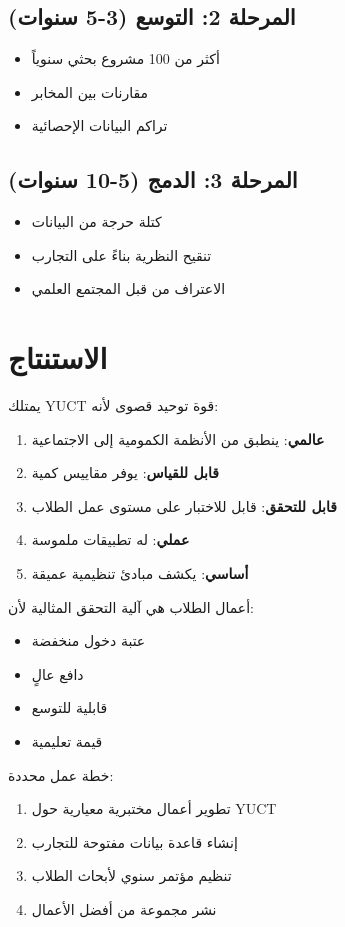 \documentclass[12pt,a4paper]{article}
\begin{document}
	\subsection{المرحلة 2: التوسع (3-5 سنوات)}
	\begin{itemize}
		\item أكثر من 100 مشروع بحثي سنوياً
		\item مقارنات بين المخابر
		\item تراكم البيانات الإحصائية
	\end{itemize}
	
	\subsection{المرحلة 3: الدمج (5-10 سنوات)}
	\begin{itemize}
		\item كتلة حرجة من البيانات
		\item تنقيح النظرية بناءً على التجارب
		\item الاعتراف من قبل المجتمع العلمي
	\end{itemize}
	
	\section{الاستنتاج}
	
	يمتلك YUCT قوة توحيد قصوى لأنه:
	\begin{enumerate}
		\item \textbf{عالمي}: ينطبق من الأنظمة الكمومية إلى الاجتماعية
		\item \textbf{قابل للقياس}: يوفر مقاييس كمية
		\item \textbf{قابل للتحقق}: قابل للاختبار على مستوى عمل الطلاب
		\item \textbf{عملي}: له تطبيقات ملموسة
		\item \textbf{أساسي}: يكشف مبادئ تنظيمية عميقة
	\end{enumerate}
	
	أعمال الطلاب هي آلية التحقق المثالية لأن:
	\begin{itemize}
		\item عتبة دخول منخفضة
		\item دافع عالٍ
		\item قابلية للتوسع
		\item قيمة تعليمية
	\end{itemize}
	
	خطة عمل محددة:
	\begin{enumerate}
		\item تطوير أعمال مختبرية معيارية حول YUCT
		\item إنشاء قاعدة بيانات مفتوحة للتجارب
		\item تنظيم مؤتمر سنوي لأبحاث الطلاب
		\item نشر مجموعة من أفضل الأعمال
	\end{enumerate}
	
\end{document}
